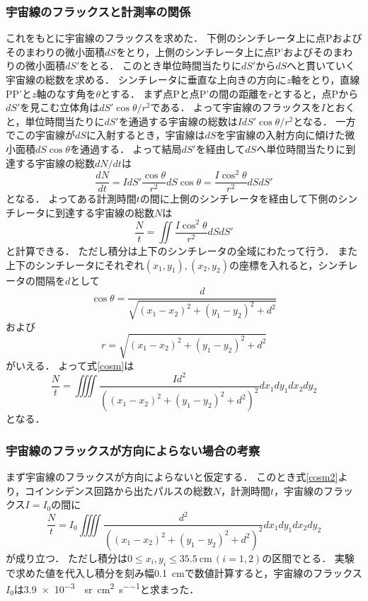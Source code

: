 \documentclass[a4paper,11pt]{jsarticle}
\begin{document}
\subsubsection{宇宙線のフラックスと計測率の関係}
これをもとに宇宙線のフラックスを求めた．
下側のシンチレータ上に点Pおよびそのまわりの微小面積$dS$をとり，上側のシンチレータ上に点P'およびそのまわりの微小面積$dS'$をとる．
このとき単位時間当たりに$dS'$から$dS$へと貫いていく宇宙線の総数を求める．
シンチレータに垂直な上向きの方向に$z$軸をとり，直線PP'と$z$軸のなす角を$\theta$とする．
まず点Pと点P'の間の距離を$r$とすると，点Pから$dS'$を見こむ立体角は$dS'\cos{\theta}/r^2$である．
よって宇宙線のフラックスを$I$とおくと，単位時間当たりに$dS'$を通過する宇宙線の総数は$IdS'\cos{\theta}/r^2$となる．
一方でこの宇宙線が$dS$に入射するとき，宇宙線は$dS$を宇宙線の入射方向に傾けた微小面積$dS\cos{\theta}$を通過する．
よって結局$dS'$を経由して$dS$へ単位時間当たりに到達する宇宙線の総数$dN/dt$は
\begin{equation}
  \frac{dN}{dt} = IdS'\frac{\cos{\theta}}{r^2} dS\cos{\theta} = \frac{I\cos^2{\theta}}{r^2}dSdS'
\end{equation}
となる．
よってある計測時間$t$の間に上側のシンチレータを経由して下側のシンチレータに到達する宇宙線の総数$N$は
\begin{equation}
  \frac{N}{t} = \iint \frac{I\cos^2{\theta}}{r^2} dSdS' 
  \label{cosm}
\end{equation}
と計算できる．
ただし積分は上下のシンチレータの全域にわたって行う．
また上下のシンチレータにそれぞれ$(x_1,y_1),(x_2,y_2)$の座標を入れると，シンチレータの間隔を$d$として
\begin{equation}
  \cos{\theta} = \frac{d}{\sqrt{(x_1 - x_2)^2 + (y_1 - y_2)^2 + d^2}}
\end{equation}
および
\begin{equation}
  r = \sqrt{(x_1 - x_2)^2 + (y_1 - y_2)^2 + d^2}
\end{equation}
がいえる．
よって式\eqref{cosm}は
\begin{equation}
  \frac{N}{t} = \iiiint \frac{Id^2}{\left((x_1 - x_2)^2 + (y_1 - y_2)^2 + d^2 \right)^2}dx_1dy_1dx_2dy_2
  \label{cosm2}
\end{equation}
となる．

\subsubsection{宇宙線のフラックスが方向によらない場合の考察}
まず宇宙線のフラックスが方向によらないと仮定する．
このとき式\eqref{cosm2}より，コインシデンス回路から出たパルスの総数$N$，計測時間$t$，宇宙線のフラックス$I=I_0$の間に
\begin{equation}
  \frac{N}{t} = I_0 \iiiint \frac{d^2}{\left((x_1 - x_2)^2 + (y_1 - y_2)^2 + d^2 \right)^2} dx_1dy_1dx_2dy_2
  \label{flux_const}
\end{equation}
が成り立つ．
ただし積分は$0\le x_i, y_i \le \SI{35.5}{\cm}\,(i=1,2)$の区間でとる．
実験で求めた値を代入し積分を刻み幅\SI{0.1}{\cm}で数値計算すると，宇宙線のフラックス$I_0$は\SI{3.9e-3}{\per\steradian\per\cm^2\per\s}と求まった．
\end{document}
